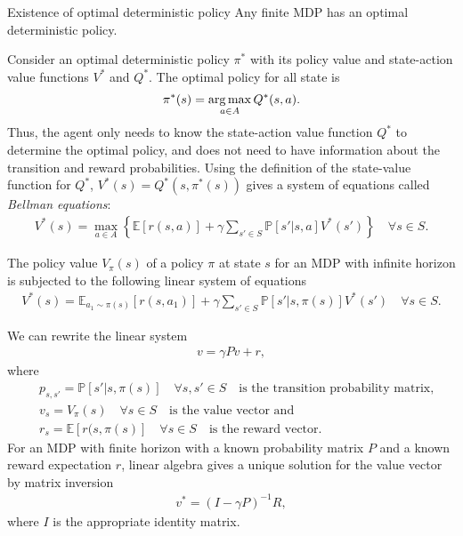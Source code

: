 \begin{theorem}{Existence of optimal deterministic policy}
    Any finite MDP has an optimal deterministic policy.
\end{theorem}
Consider an optimal deterministic policy $\pi^{*}$ with its policy value and
state-action value functions $V^{*}$ and $Q^{*}$. The optimal policy for all
state is
\begin{align}
    \pi^{*}(s) = \operatorname*{arg\,max}_{a \in A} Q^{*}(s,a).
\end{align}
Thus, the agent only needs to know the state-action value function $Q^{*}$ to
determine the optimal policy, and does not need to have information about the
transition and reward probabilities. Using the definition of the state-value
function for $Q^{*}$, $V^{*}(s) = Q^{*}(s, \pi^{*}(s))$ gives a system of
equations called \textit{Bellman equations}:
\begin{align}
    V^{*}(s) = \max_{a\in A} \left\{ \mathbb{E}[r(s, a)] + \gamma\sum_{s'\in S}
    \mathbb{P}[s'|s,a] V^{*}(s') \right\} \quad \forall s \in S.
\end{align}
\begin{theorem}
    The policy value $V_\pi(s)$ of a policy $\pi$ at state $s$ for an MDP
    with infinite horizon is subjected to the following linear system of
    equations
    \begin{align}
        V^{*}(s) = \mathbb{E}_{a_1 \sim \pi(s)}[r(s, a_1)] + \gamma\sum_{s'\in S}
        \mathbb{P}[s'|s, \pi(s)] V^{*}(s') \quad \forall s \in S.
    \end{align}
\end{theorem}
We can rewrite the linear system
\begin{align}
    v = \gamma P v + r,
\end{align}
where
\begin{align}
    &p_{s, s'} = \mathbb{P}[s'|s, \pi(s)] \quad \forall s,s' \in S \quad
    \text{is the transition probability matrix,}\\
    &v_s = V_\pi(s) \quad \forall s \in S \quad \text{is the value vector and }\\
    &r_s = \mathbb{E}[r(s, \pi(s)] \quad \forall s \in S \quad \text{is the reward
    vector}.
\end{align}
For an MDP with finite horizon with a known probability matrix $P$ and a
known reward expectation $r$, linear algebra gives a unique solution for
the value vector by matrix inversion
\begin{align}
    v^{*} = (I - \gamma P)^{-1} R,
\end{align}
where $I$ is the appropriate identity matrix.
\newline

